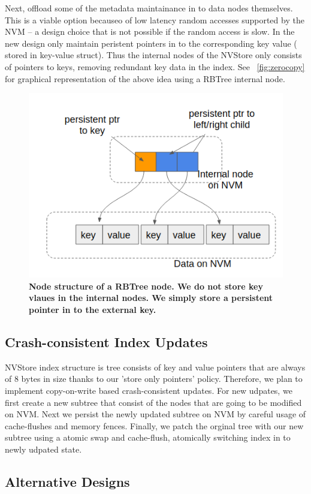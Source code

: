 Next, offload some of the metadata maintainance in to data nodes themselves. This is a viable
option becauseo of low latency random accesses supported by the NVM -- a design choice that
is not possible if the random access is slow. In the new design only maintain peristent pointers
in to the corresponding key value ( stored in key-value struct). Thus the internal nodes of the 
NVStore only consists of pointers to keys, removing redundant key data in the index. 
See ~\autoref{fig:zerocopy} for graphical representation of the above idea using a RBTree internal
node.

\begin{figure}[]   
	\centering
	\includegraphics[width=\linewidth]{figures/zerocopy.png} 
	\caption{\bf Node structure of a RBTree node. We do not store key vlaues in the internal nodes. We simply
	store a persistent pointer in to the external key.} 
	\label{fig:zerocopy} 
\end{figure}

\subsection{Crash-consistent Index Updates}
NVStore index structure is tree consists of key and value pointers that are always of 8 bytes in size
thanks to our 'store only pointers' policy. Therefore, we plan to implement copy-on-write based 
crash-consistent updates. For new udpates, we first create a new subtree that consist of the nodes
that are going to be modified on NVM. Next we persist the newly updated subtree on NVM by careful
usage of cache-flushes and memory fences. Finally, we patch the orginal tree with our new subtree
using a atomic swap and cache-flush, atomically switching index in to newly udpated state.

\subsection{Alternative Designs}





\cite{pmwcas}
